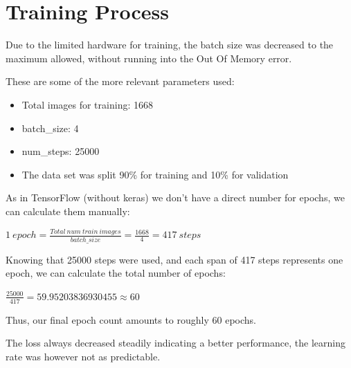 \documentclass[10pt]{article}
\begin{document}
\section{Training Process} 

 	Due to the limited hardware for training, the batch size was decreased to the maximum allowed, without running into the Out Of Memory error. 

	These are some of the more relevant parameters used:
	
	\begin{itemize}
		\item Total images for training: 1668
		\item batch\_size: 4
		\item num\_steps: 25000
		\item The data set was split 90\% for training and 10\% for validation
	\end{itemize}

	As in TensorFlow (without keras) we don't have a direct number for epochs, we can calculate them manually:
	
	$1\ epoch =\frac{Total\ num\ train\ images}{batch\_size} = \frac{1668}{4} = 417\ steps$

	Knowing that 25000 steps were used, and each span of 417 steps represents one epoch, we can calculate the total number of epochs: 
	
	$\frac{25000}{417} = 59.95203836930455 \approx 60$

	Thus, our final epoch count amounts to roughly 60 epochs.

	The loss always decreased steadily indicating a better performance, the learning rate was however not as predictable.
\end{document}
